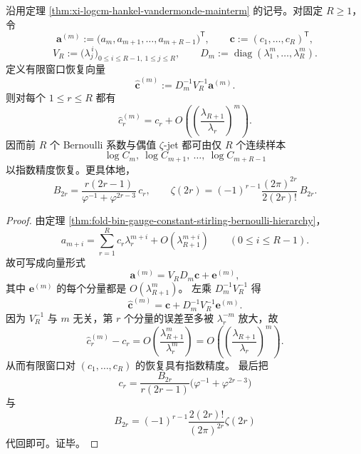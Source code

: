 \begin{corollary}\label{cor:xi-logcm-finite-window-bernoulli-recovery}
沿用定理 \ref{thm:xi-logcm-hankel-vandermonde-mainterm} 的记号。对固定 \(R\ge 1\)，令
\[
\mathbf a^{(m)}:=
\bigl(a_m,a_{m+1},\dots,a_{m+R-1}\bigr)^{\mathsf T},
\qquad
\mathbf c:=(c_1,\dots,c_R)^{\mathsf T},
\]
\[
V_R:=\bigl(\lambda_j^{\,i}\bigr)_{0\le i\le R-1,\ 1\le j\le R},
\qquad
D_m:=\operatorname{diag}(\lambda_1^m,\dots,\lambda_R^m).
\]
定义有限窗口恢复向量
\[
\widehat{\mathbf c}^{(m)}:=D_m^{-1}V_R^{-1}\mathbf a^{(m)}.
\]
则对每个 \(1\le r\le R\) 都有
\[
\boxed{\;
\widehat c_r^{(m)}=c_r+O\!\left(\left(\frac{\lambda_{R+1}}{\lambda_r}\right)^m\right).
\;}
\]
因而前 \(R\) 个 Bernoulli 系数与偶值 \(\zeta\)-jet 都可由仅 \(R\) 个连续样本
\[
\log C_m,\ \log C_{m+1},\ \dots,\ \log C_{m+R-1}
\]
以指数精度恢复。更具体地，
\[
B_{2r}=
\frac{r(2r-1)}{\varphi^{-1}+\varphi^{2r-3}}\,c_r,
\qquad
\zeta(2r)=(-1)^{r-1}\frac{(2\pi)^{2r}}{2(2r)!}\,B_{2r}.
\]
\end{corollary}
\begin{proof}
由定理 \ref{thm:fold-bin-gauge-constant-stirling-bernoulli-hierarchy}，
\[
a_{m+i}=\sum_{r=1}^{R}c_r\lambda_r^{m+i}+O(\lambda_{R+1}^{m+i})
\qquad (0\le i\le R-1).
\]
故可写成向量形式
\[
\mathbf a^{(m)}=V_R D_m \mathbf c+\mathbf e^{(m)},
\]
其中 \(\mathbf e^{(m)}\) 的每个分量都是 \(O(\lambda_{R+1}^{m})\)。
左乘 \(D_m^{-1}V_R^{-1}\) 得
\[
\widehat{\mathbf c}^{(m)}
=
\mathbf c+D_m^{-1}V_R^{-1}\mathbf e^{(m)}.
\]
因为 \(V_R^{-1}\) 与 \(m\) 无关，第 \(r\) 个分量的误差至多被 \(\lambda_r^{-m}\) 放大，故
\[
\widehat c_r^{(m)}-c_r=
O\!\left(\frac{\lambda_{R+1}^m}{\lambda_r^m}\right)
=
O\!\left(\left(\frac{\lambda_{R+1}}{\lambda_r}\right)^m\right).
\]
从而有限窗口对 \((c_1,\dots,c_R)\) 的恢复具有指数精度。
最后把
\[
c_r=\frac{B_{2r}}{r(2r-1)}\bigl(\varphi^{-1}+\varphi^{2r-3}\bigr)
\]
与
\[
B_{2r}=(-1)^{r-1}\frac{2(2r)!}{(2\pi)^{2r}}\zeta(2r)
\]
代回即可。证毕。
\end{proof}

